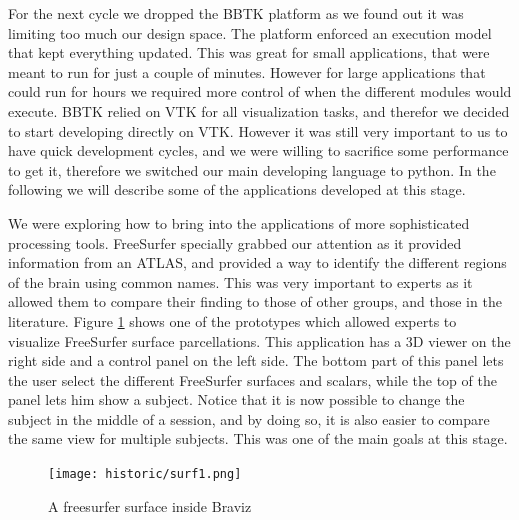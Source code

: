 For the next cycle we dropped the BBTK platform as we found out it was limiting too much our design space. The platform enforced an execution model that kept everything updated. This was great for small applications, that were meant to run for just a couple of minutes. However for large applications that could run for hours we required more control of when the different modules would execute. BBTK relied on VTK for all visualization tasks, and therefor we decided to start developing directly on VTK. However it was still very important to us to have quick development cycles, and we were willing to sacrifice some performance to get it, therefore we switched our main developing language to python. In the following we will describe some of the applications developed at this stage. 

We were exploring how to bring into the applications of more sophisticated processing tools. FreeSurfer specially grabbed our attention as it provided information from an ATLAS, and provided a way to identify the different regions of the brain using common names. This was very important to experts as it allowed them to compare their finding to those of other groups, and those in the literature. Figure \ref{fig_surf_1} shows one of the prototypes which allowed experts to visualize FreeSurfer surface parcellations. This application has a 3D viewer on the right side and a control panel on the left side. The bottom part of this panel lets the user select the different FreeSurfer surfaces and scalars, while the top of the panel lets him show a subject. Notice that it is now possible to change the subject in the middle of a session, and by doing so, it is also easier to compare the same view for multiple subjects. This was one of the main goals at this stage. 

\begin{figure}
\centering
\texttt{[image: historic/surf1.png]} 
\caption{\label{fig_surf_1}A freesurfer surface inside Braviz}
\end{figure}

